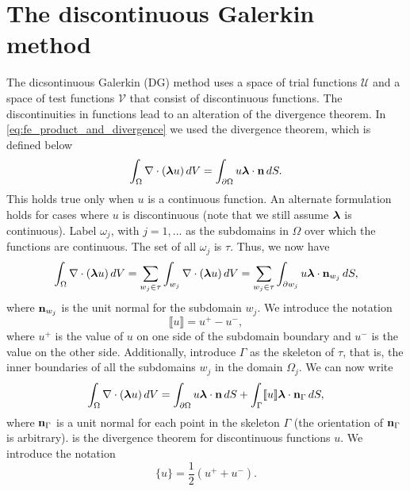 \documentclass[oneside,a4paper,11pt]{report}
\begin{document}
\section{The discontinuous Galerkin method}
The dicsontinuous Galerkin (DG) method uses a space of trial functions $\mathcal{U}$ and a space of test functions $\mathcal{V}$ that consist of discontinuous functions. The discontinuities in functions lead to an alteration of the divergence theorem. In \cref{eq:fe_product_and_divergence} we used the divergence theorem, which is defined below
\begin{equation}
    \int_\Omega \nabla \cdot (\bm \lambda u) \, dV = \int_{\partial \Omega} u \bm \lambda \cdot \mathbf{n} \, dS.
\end{equation}
This holds true only when $u$ is a continuous function. An alternate formulation holds for cases where $u$ is discontinuous (note that we still assume $\bm \lambda$ is continuous). Label $\omega_j$, with $j=1,...$ as the subdomains in $\Omega$ over which the functions are continuous. The set of all $\omega_j$ is $\tau$. Thus, we now have
\begin{equation}
    \int_\Omega \nabla \cdot (\bm \lambda u) \, dV = \sum_{w_j \in \tau} \int_{w_j} \nabla \cdot (\bm \lambda u) \, dV = \sum_{w_j \in \tau} \int_{\partial w_j} u \bm \lambda \cdot \mathbf{n}_{w_j} \, dS,
\end{equation}
where $\mathbf{n}_{w_j}$ is the unit normal for the subdomain $w_j$. We introduce the notation 
\begin{equation}
    \llbracket u \rrbracket = u^+ - u^-,
\end{equation}
where $u^+$ is the value of $u$ on one side of the subdomain boundary and $u^-$ is the value on the other side. Additionally, introduce $\Gamma$ as the skeleton of $\tau$, that is, the inner boundaries of all the subdomains $w_j$ in the domain $\Omega_j$. We can now write
\begin{equation}
    \label{eq:dg_div_theorem_discontinuous}
    \int_\Omega \nabla \cdot (\bm \lambda u) \, dV = \int_{\partial \Omega} u \bm \lambda \cdot \mathbf{n} \, dS + \int_{\Gamma} \llbracket u \rrbracket \bm \lambda \cdot \mathbf{n}_{\Gamma} \, dS,
\end{equation}
where $\mathbf{n}_{\Gamma}$ is a unit normal for each point in the skeleton $\Gamma$ (the orientation of $\mathbf{n}_{\Gamma}$ is arbitrary).  is the divergence theorem for discontinuous functions $u$. We introduce the notation
\begin{equation}
\{ u \} = \frac{1}{2} \left ( u^+ + u^- \right ).
\end{equation}
\end{document}
